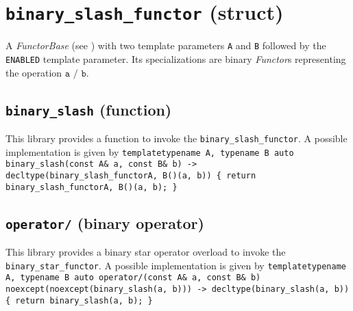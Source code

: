 \section{\texttt{binary\_slash\_functor} (struct)}
A \textit{FunctorBase} (see \cite{functors}) with two template parameters \texttt{A} and \texttt{B} followed by the \texttt{ENABLED} template parameter.
Its specializations are binary \textit{Functor}s representing the operation $\texttt{a / b}$.

\subsection{\texttt{binary\_slash} (function)}
This library provides a function to invoke the \texttt{binary\_slash\_functor}.
A possible implementation is given by\newline
\texttt{template\textlangle typename A, typename B\textrangle\newline
auto\newline
binary\_slash(const A\& a, const B\& b)\newline
-> decltype(binary\_slash\_functor\textlangle A, B\textrangle()(a, b))\newline
\{ return binary\_slash\_functor\textlangle A, B\textrangle()(a, b); \}}

\subsection{\texttt{operator/} (binary operator)}
This library provides a binary star operator overload to invoke the \texttt{binary\_star\_functor}.
A possible implementation is given by\newline
\texttt{template\textlangle typename A, typename B\textrangle\newline
auto\newline
operator/(const A\& a, const B\& b)\newline
noexcept(noexcept(binary\_slash(a, b)))\newline
-> decltype(binary\_slash(a, b))\newline
\{ return binary\_slash(a, b); \}}
